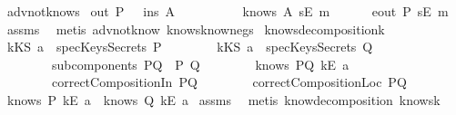 \begin{isabellebody}
\endisatagproof
{\isafoldproof}%
%
\isadelimproof
\isanewline
%
\endisadelimproof
\isanewline
{}\isamarkupfalse%
\ adv{\isacharunderscore}not{\isacharunderscore}knows{}{\isacharcolon}\isanewline
{}\ {\isachardoublequoteopen}out\ P\ \ {\isasymsubseteq}\ ins\ A{\isachardoublequoteclose}\isanewline
\ \ \ \ \ \ \ \ \ {\isachardoublequoteopen}{\isasymnot}\ knows\ A\ {\isacharbrackleft}sE\ m{\isacharbrackright}{\isachardoublequoteclose}\ \isanewline
{}\ \ \ \ {\isachardoublequoteopen}{\isasymnot}\ eout\ P\ {\isacharparenleft}sE\ m{\isacharparenright}{\isachardoublequoteclose}\isanewline
%
\isadelimproof
%
\endisadelimproof
%
\isatagproof
{}\isamarkupfalse%
\ assms\ \isamarkupfalse%
\ {\isacharparenleft}metis\ adv{\isacharunderscore}not{\isacharunderscore}know{}\ knows{}know{\isacharunderscore}neg{\isacharunderscore}s{\isacharparenright}%
\endisatagproof
{\isafoldproof}%
%
\isadelimproof
\isanewline
%
\endisadelimproof
\isanewline
{}\isamarkupfalse%
\ knows{\isacharunderscore}decomposition{\isacharunderscore}{}{\isacharunderscore}k{\isacharcolon}\isanewline
{}\ {\isachardoublequoteopen}kKS\ a\ {\isasymnotin}\ specKeysSecrets\ P{\isachardoublequoteclose}\isanewline
\ \ \ \ \ \ \ \ {\isachardoublequoteopen}kKS\ a\ {\isasymnotin}\ specKeysSecrets\ Q{\isachardoublequoteclose}\isanewline
\ \ \ \ \ \ \ \ {\isachardoublequoteopen}subcomponents\ PQ\ {\isacharequal}\ {\isacharbraceleft}P{\isacharcomma}\ Q{\isacharbraceright}{\isachardoublequoteclose}\isanewline
\ \ \ \ \ \ \ \ {\isachardoublequoteopen}knows\ PQ\ {\isacharbrackleft}kE\ a{\isacharbrackright}{\isachardoublequoteclose}\isanewline
\ \ \ \ \ \ \ \ {\isachardoublequoteopen}correctCompositionIn\ PQ{\isachardoublequoteclose}\isanewline
\ \ \ \ \ \ \ \ {\isachardoublequoteopen}correctCompositionLoc\ PQ{\isachardoublequoteclose}\isanewline
{}\ {\isachardoublequoteopen}knows\ P\ {\isacharbrackleft}kE\ a{\isacharbrackright}\ {\isasymor}\ knows\ Q\ {\isacharbrackleft}kE\ a{\isacharbrackright}{\isachardoublequoteclose}\isanewline
%
\isadelimproof
%
\endisadelimproof
%
\isatagproof
{}\isamarkupfalse%
\ assms\ \isamarkupfalse%
\ {\isacharparenleft}metis\ know{\isacharunderscore}decomposition\ knows{}k{\isacharparenright}%
\endisatagproof
{\isafoldproof}%
%
\isadelimproof
\isanewline
%
\endisadelimproof
\isanewline

\end{isabellebody}
